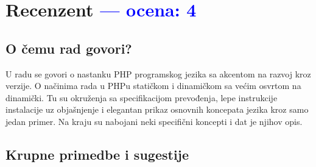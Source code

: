 \documentclass[a4paper]{report}
\newcommand{\odgovor}[1]{\textcolor{blue}{#1}}
\begin{document}
\chapter{Recenzent \odgovor{--- ocena: 4} }


\section{O čemu rad govori?}
U radu se govori o nastanku PHP programskog jezika sa akcentom na razvoj kroz verzije. O načinima rada u PHPu statičkom i dinamičkom sa većim osvrtom na dinamički. Tu su okruženja sa specifikacijom prevođenja, lepe instrukcije instalacije uz objašnjenje i elegantan prikaz osnovnih koncepata jezika kroz samo jedan primer. Na kraju su nabojani neki specifični koncepti i dat je njihov opis.

\section{Krupne primedbe i sugestije}
\end{document}
